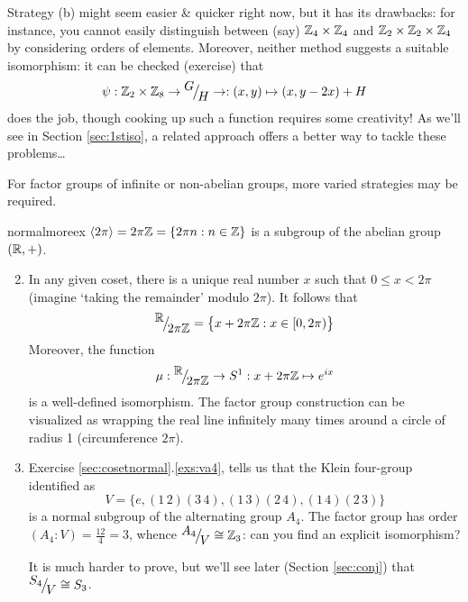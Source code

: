 	Strategy (b) might seem easier \& quicker right now, but it has its drawbacks: for instance, you cannot easily distinguish between (say) $\mathbb{Z}_4\times\mathbb{Z}_4$ and $\mathbb{Z}_2\times\mathbb{Z}_2\times\mathbb{Z}_4$ by considering orders of elements. Moreover, neither method suggests a suitable isomorphism: it can be checked (exercise) that
\[
	\psi:\mathbb{Z}_2\times\mathbb{Z}_8\to{}^{\textstyle {G}}\!\big/_{\textstyle \!{H}}\to:(x,y)\mapsto (x,y-2x)+H
\]
does the job, though cooking up such a function requires some creativity! As we'll see in Section \ref{sec:1stiso}, a related approach offers a better way to tackle these problems\ldots 




For factor groups of infinite or non-abelian groups, more varied strategies may be required.

\begin{examples}{}{normalmoreex}
	\exstart $\left\langle 2\pi\right\rangle=2\pi\mathbb{Z}=\{2\pi n:n\in\mathbb{Z}\}$ is a subgroup of the abelian group $(\mathbb{R},+)$.\vspace{-5pt}
	\begin{enumerate}\setcounter{enumi}{1}
	  \item[] In any given coset, there is a unique real number $x$ such that $0\le x<2\pi$ (imagine `taking the remainder' modulo $2\pi$). It follows that
	  \[
	  	{}^{\textstyle {\mathbb{R}}}\!\big/_{\textstyle \!{2\pi\mathbb{Z}}}=\bigl\{x+2\pi\mathbb{Z}:x\in[0,2\pi)\bigr\}
	  \]
	  Moreover, the function
	  \[
	  	\mu:{}^{\textstyle {\mathbb{R}}}\!\big/_{\textstyle \!{2\pi\mathbb{Z}}}\to S^1:x+2\pi\mathbb{Z}\mapsto e^{ix}
	  \]
	  is a well-defined isomorphism. The factor group construction can be visualized as wrapping the real line infinitely many times around a circle of radius 1 (circumference $2\pi$).
	  
	  \item\label{ex:a4normal} Exercise \ref*{sec:cosetnormal}.\ref{exs:va4}, tells us that the Klein four-group identified as
	  \[
			V=\bigl\{
				e,(1\,2)(3\,4),(1\,3)(2\,4),(1\,4)(2\,3)
			\bigr\}
		\]
	  is a normal subgroup of the alternating group $A_4$. The factor group has order $(A_4:V)=\frac{12}4=3$, whence ${}^{\textstyle {A_4}}\!\big/_{\textstyle \!{V}}\cong\mathbb{Z}_3$: can you find an explicit isomorphism?\par
	  It is much harder to prove, but we'll see later (Section \ref{sec:conj}) that ${}^{\textstyle {S_4}}\!\big/_{\textstyle \!{V}}\cong S_3$.
	  

\end{enumerate}
\end{examples}
